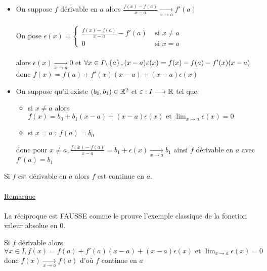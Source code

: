 \begin{dem}
    \begin{itemize}
        \item \impdir On suppose \(f\) dérivable en \(a\) alors \(\frac{f(x)-f(a)}{x-a} \underset{x \to a}{\to} f'(a)\)\\~\\
        On pose \(\epsilon(x) = \begin{cases}
            \frac{f(x) -f(a)}{x-a} - f'(a) &\text{ si } x\neq a \\
            0 &\text{ si } x=a
        \end{cases}\) \\~\\
        alors \(\epsilon(x) \underset{x \to a}{\to} 0 \) et \(\forall x \in I \backslash \left\lbrace a\right\rbrace, (x-a)\varepsilon(x) = f(x) - f(a) - f'(x)(x-a)\) donc \(f(x) =f(a) + f'(x)(x-a) + (x-a)\epsilon(x)\)
        \item \imprec On suppose qu'il existe \((b_0,b_1) \in \mathbb{R}^2\) et \(\varepsilon : I \longrightarrow \mathbb{R}\) tel que:
        \begin{itemize}
            \item si \(x\neq a \) alors \(f (x) = b_0 + b_1(x - a) + (x - a) \epsilon(x)\text{ et }\lim_{x\to a} \epsilon(x) = 0\)
            \item si \(x = a\)  : \(f(a) = b_0\)
        \end{itemize}
        donc pour \(x \neq a , \frac{f(x) - f(a)}{x-a} = b_1 + \epsilon(x) \underset{x \to a}{\to} b_1\) ainsi \(f\) dérivable en \(a\) avec \(f'(a) = b_1\)   
    \end{itemize}
\end{dem}

\begin{defprop}
	Si \(f\) est dérivable en \(a\) alors \(f\) est continue en \(a\).\\~\\
	\underline{Remarque}\\~\\
	La réciproque est FAUSSE comme le prouve l’exemple classique de la fonction valeur absolue en \(0\).
\end{defprop}
\begin{dem}
    Si \(f\) dérivable alors \(\forall x \in I, f (x) = f(a) + f'(a)(x - a) + (x - a) \epsilon(x)\text{ et }\lim_{x\to a} \epsilon(x) = 0\) donc \(f(x) \underset{x \to a}{\to} f(a)\) d'où \(f\) continue en \(a\)
\end{dem}

